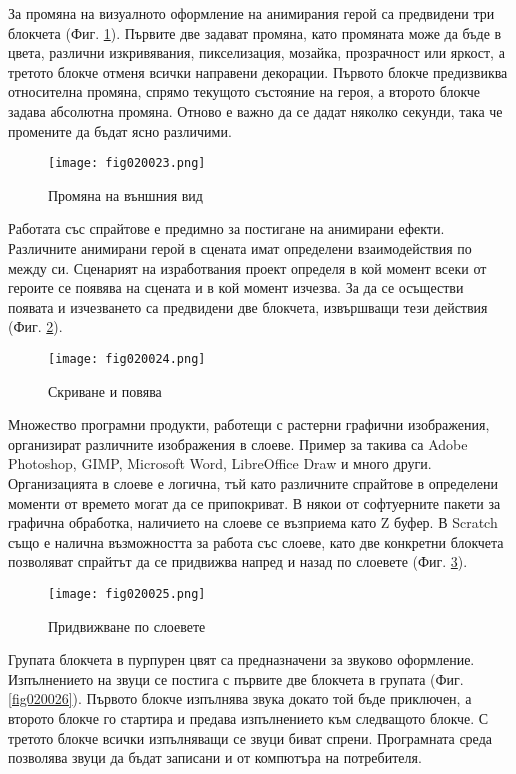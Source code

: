 За промяна на визуалното оформление на анимирания герой са предвидени три блокчета (Фиг. \ref{fig020023}). Първите две задават промяна, като промяната може да бъде в цвета, различни изкривявания, пикселизация, мозайка, прозрачност или яркост, а третото блокче отменя всички направени декорации. Първото блокче предизвиква относителна промяна, спрямо текущото състояние на героя, а второто блокче задава абсолютна промяна. Отново е важно да се дадат няколко секунди, така че промените да бъдат ясно различими. 

\begin{figure}[H]
  \centering
  \texttt{[image: fig020023.png]}
  \caption{Промяна на външния вид}
\label{fig020023}
\end{figure}

Работата със спрайтове е предимно за постигане на анимирани ефекти. Различните анимирани герой в сцената имат определени взаимодействия по между си. Сценарият на изработвания проект определя в кой момент всеки от героите се появява на сцената и в кой момент изчезва. За да се осъществи появата и изчезването са предвидени две блокчета, извършващи тези действия (Фиг. \ref{fig020024}).

\begin{figure}[H]
  \centering
  \texttt{[image: fig020024.png]}
  \caption{Скриване и повява}
\label{fig020024}
\end{figure}

Множество програмни продукти, работещи с растерни графични изображения, организират различните изображения в слоеве. Пример за такива са Adobe Photoshop, GIMP, Microsoft Word, LibreOffice Draw и много други. Организацията в слоеве е логична, тъй като различните спрайтове в определени моменти от времето могат да се припокриват. В някои от софтуерните пакети за графична обработка, наличието на слоеве се възприема като Z буфер. В Scratch също е налична възможността за работа със слоеве, като две конкретни блокчета позволяват спрайтът да се придвижва напред и назад по слоевете (Фиг. \ref{fig020025}).

\begin{figure}[H]
  \centering
  \texttt{[image: fig020025.png]}
  \caption{Придвижване по слоевете}
\label{fig020025}
\end{figure}

Групата блокчета в пурпурен цвят са предназначени за звуково оформление. Изпълнението на звуци се постига с първите две блокчета в групата (Фиг. \ref{fig020026}). Първото блокче изпълнява звука докато той бъде приключен, а второто блокче го стартира и предава изпълнението към следващото блокче. С третото блокче всички изпълняващи се звуци биват спрени. Програмната среда позволява звуци да бъдат записани и от компютъра на потребителя. 

